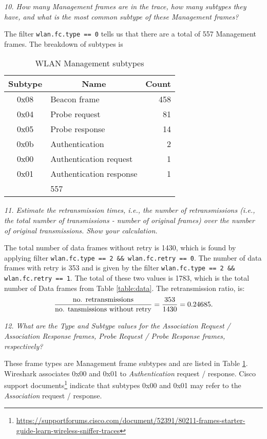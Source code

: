 \textit{10. How many Management frames are in the trace, how many subtypes they have, and what is the most common subtype of these Management frames?}

The filter \texttt{wlan.fc.type == 0} tells us that there are a total of 557 Management frames. The breakdown of subtypes is

\begin{table}[htpb]
	\centering
	\caption{WLAN Management subtypes}
	\label{table:mgmt}
	\begin{tabular}{@{}clr@{}}
		\toprule
		Subtype & \multicolumn{1}{c}{Name} & \multicolumn{1}{c}{Count} \\ \midrule
		0x08 & Beacon frame & 458 \\
		0x04 & Probe request & 81 \\
		0x05 & Probe response & 14 \\
		0x0b & Authentication & 2 \\
		0x00 & Authentication request & 1 \\
		0x01 & Authentication response & 1 \\ \hhline{~~=}
		\multicolumn{2}{r}{Total} & 557 \\ %
	\end{tabular}
\end{table}

\textit{11. Estimate the retransmission times, i.e., the number of retransmissions (i.e., the total number of transmissions - number of original frames) over the number of original transmissions. Show your calculation.}

The total number of data frames without retry is 1430, which is found by applying filter \texttt{wlan.fc.type == 2 \&\& wlan.fc.retry == 0}. The number of data frames with retry is 353 and is given by the filter \texttt{wlan.fc.type == 2 \&\& wlan.fc.retry == 1}. The total of these two values is 1783, which is the total number of Data frames from Table \ref{table:data}. The retransmission ratio, is:
\begin{align*}
	{\text{no. retransmissions} \over \text{no. tansmissions without retry}} = {353 \over 1430} = 0.24685.
\end{align*}

\textit{12. What are the Type and Subtype values for the Association Request / Association Response frames, Probe Request / Probe Response frames, respectively?}

These frame types are Management frame subtypes and are listed in Table \ref{table:mgmt}. Wireshark associates 0x00 and 0x01 to \textit{Authentication} request / response. Cisco support documents\footnote{\url{https://supportforums.cisco.com/document/52391/80211-frames-starter-guide-learn-wireless-sniffer-traces}} indicate that subtypes 0x00 and 0x01 may refer to the \textit{Association} request / response.